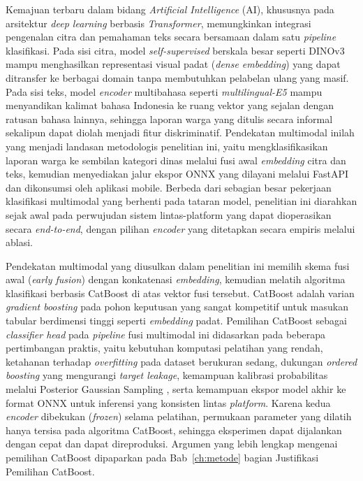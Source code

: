 Kemajuan terbaru dalam bidang \textit{Artificial Intelligence} (AI), khususnya pada arsitektur \textit{deep learning} berbasis \textit{Transformer}, memungkinkan integrasi pengenalan citra dan pemahaman teks secara bersamaan dalam satu \textit{pipeline} klasifikasi. Pada sisi citra, model \textit{self-supervised} berskala besar seperti DINOv3 \citep{simeoniDINOv32025} mampu menghasilkan representasi visual padat (\textit{dense embedding}) yang dapat ditransfer ke berbagai domain tanpa membutuhkan pelabelan ulang yang masif. Pada sisi teks, model \textit{encoder} multibahasa seperti \textit{multilingual-E5} \citep{wangE5Multilingual2024} mampu menyandikan kalimat bahasa Indonesia ke ruang vektor yang sejalan dengan ratusan bahasa lainnya, sehingga laporan warga yang ditulis secara informal sekalipun dapat diolah menjadi fitur diskriminatif. Pendekatan multimodal inilah yang menjadi landasan metodologis penelitian ini, yaitu mengklasifikasikan laporan warga ke sembilan kategori dinas melalui fusi awal \textit{embedding} citra dan teks, kemudian menyediakan jalur ekspor ONNX yang dilayani melalui FastAPI dan dikonsumsi oleh aplikasi mobile. Berbeda dari sebagian besar pekerjaan klasifikasi multimodal yang berhenti pada tataran model, penelitian ini diarahkan sejak awal pada perwujudan sistem lintas-platform yang dapat dioperasikan secara \textit{end-to-end}, dengan pilihan \textit{encoder} yang ditetapkan secara empiris melalui ablasi.

Pendekatan multimodal yang diusulkan dalam penelitian ini memilih skema fusi awal (\textit{early fusion}) dengan konkatenasi \textit{embedding}, kemudian melatih algoritma klasifikasi berbasis CatBoost di atas vektor fusi tersebut. CatBoost \citep{prokhorenkovaCatBoost2018} adalah varian \textit{gradient boosting} pada pohon keputusan yang sangat kompetitif untuk masukan tabular berdimensi tinggi seperti \textit{embedding} padat. Pemilihan CatBoost sebagai \textit{classifier head} pada \textit{pipeline} fusi multimodal ini didasarkan pada beberapa pertimbangan praktis, yaitu kebutuhan komputasi pelatihan yang rendah, ketahanan terhadap \textit{overfitting} pada dataset berukuran sedang, dukungan \textit{ordered boosting} yang mengurangi \textit{target leakage}, kemampuan kalibrasi probabilitas melalui Posterior Gaussian Sampling \citep{ustimenkoCatBoostUncertainty2023}, serta kemampuan ekspor model akhir ke format ONNX untuk inferensi yang konsisten lintas \textit{platform}. Karena kedua \textit{encoder} dibekukan (\textit{frozen}) selama pelatihan, permukaan parameter yang dilatih hanya tersisa pada algoritma CatBoost, sehingga eksperimen dapat dijalankan dengan cepat dan dapat direproduksi. Argumen yang lebih lengkap mengenai pemilihan CatBoost dipaparkan pada Bab~\ref{ch:metode} bagian Justifikasi Pemilihan CatBoost.

